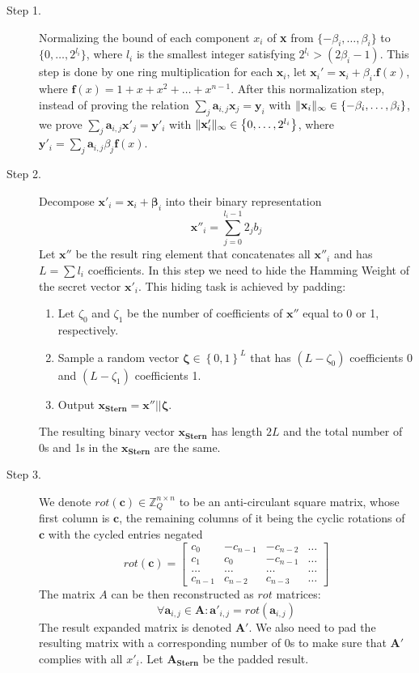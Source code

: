 \begin{description}
\item [Step 1.] Normalizing the bound of each component $x_i$ of \textbf{x} from
  $\{-\beta_i,\dots,\beta_i\}$ to $\{0,\dots,2^{l_i}\}$, where $l_i$ is the
  smallest integer satisfying $2^{l_i} > (2\beta_i -1)$. This step is done by
  one ring multiplication for each $\mathbf{x}_i$, let
  $\mathbf{x}_i' = \mathbf{x}_i + \beta_i.\mathbf{f}(x)$, where
  $\mathbf{f}(x) = 1 + x + x^2 + \dots + x^{n-1}$. After this normalization step, instead
  of proving the relation $\sum_{j}\mathbf{a}_{i,j} \mathbf{x}_j = \mathbf{y}_i$ with
  $\Vert \mathbf{x}_i \Vert_{\infty} \in \left\{ -\beta_i, \dots, \beta_i \right\}$, we prove
  $\sum_{j}\mathbf{a}_{i,j} \mathbf{x}'_j = \mathbf{y}'_i$ with
  $\Vert  \mathbf{x}'_i  \Vert_{\infty} \in \left\{ 0,\dots,2^{l_i} \right\}$, where
  $\mathbf{y}'_i = \sum_{j}\mathbf{a}_{i,j}\beta_j \mathbf{f}(x)$.

\item [Step 2.] Decompose $\mathbf{x}'_i = \mathbf{x}_i + \mathbf{\beta}_i$ into their binary representation
  \[
    \mathbf{x}''_i = \sum_{j = 0}^{l_i -1}{2_j b_j}
  \]
  Let $\mathbf{x}''$ be the result ring element that concatenates all $\mathbf{x}''_i$ and has $L = \sum{l_i}$
  coefficients. In this step we need to hide the Hamming Weight of the secret vector $\mathbf{x}'_i$. This hiding task
  is achieved by padding:
  \begin{enumerate}
  \item Let $\zeta_0$ and $\zeta_1$ be the number of coefficients of $\mathbf{x}''$ equal to 0 or 1, respectively.
  \item Sample a random vector $\mathbf{\zeta} \in \left\{ 0,1 \right\}^{L}$ that has $(L - \zeta_0)$ coefficients 0 and
    $(L - \zeta_1)$ coefficients 1.
  \item Output $\mathbf{x_{Stern}} = \mathbf{x}'' || \mathbf{\zeta}$.
  \end{enumerate}
  The resulting binary vector $\mathbf{x_{Stern}}$ has length $2L$ and the total number of 0s and 1s in the
  $\mathbf{x_{Stern}}$ are the same.

\item [Step 3.] We denote $ rot({\textbf{c}}) \in \mathbb{Z}_Q^{n\times n}$ to be an anti-circulant square matrix, whose
  first column is $\mathbf{c}$, the remaining columns of it being the cyclic rotations of $\mathbf{c}$ with the cycled entries
  negated
  \[
    rot({\mathbf{c}})=
    \begin{bmatrix}
      c_0 & -c_{n-1} & -c_{n-2} & \dots\\
      c_1 & c_0 & -c_{n-1} & \dots\\
      \dots & \dots & \dots & \dots\\
      c_{n-1} & c_{n-2} & c_{n-3} & \dots
    \end{bmatrix}
  \]
  The matrix $A$ can be then reconstructed as $rot$ matrices:
  \[
    \forall \mathbf{a}_{i,j} \in \mathbf{A}: \mathbf{a}'_{i,j} =
    rot(\mathbf{a}_{i,j})
  \]
  The result expanded matrix is denoted $\mathbf{A'}$. We also need to pad the
  resulting matrix with a corresponding number of 0s to make sure that
  $\mathbf{A'}$ complies with all $x'_i$. Let $\mathbf{A_{Stern}}$ be the padded
  result.


\end{description}
